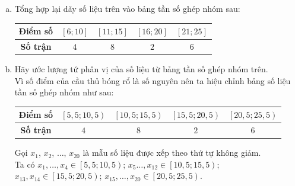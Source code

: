 \begin{bt}
{\begin{enumerate}[a)]
\begin{center}
\begin{tabular}{|c|c|c|c|c|c|c|c|c|c|}
					\hline 
					$ 14 $	& $ 15 $ & $ 18 $ & $ 18 $ & $ 21 $ & $ 22 $ & $ 23 $ & $ 24 $ & $ 25 $ & $ 25 $ \\
					\hline 
				\end{tabular} 
			\end{center}
			Tứ phân vị thứ nhất của mẫu số liệu là $ \dfrac{1}{2}\cdot\left( x_{5}+x_6\right) =\dfrac{1}{2}\cdot \left( 11+11\right)=11$.\\
			Tứ phân vị thứ hai của mẫu số liệu là $ \dfrac{1}{2}\cdot \left( x_{10}+x_{11}\right)= \dfrac{1}{2}\cdot \left( 14+14\right)=14$.\\
			Tứ phân vị thứ ba của mẫu số liệu là $ \dfrac{1}{2}\cdot \left( x_{15}+x_{16}\right)= \dfrac{1}{2}\cdot \left( 21+22\right)=21{,}5$.
			\item Tổng hợp lại dãy số liệu trên vào bảng tần số ghép nhóm sau:
			\begin{center}
				\begin{tabular}{|c|c|c|c|c|}
					\hline 
					\textbf{Điểm số}	& $ \left[ 6 ; 10\right]  $ & $ \left[ 11 ; 15\right]  $ & $ \left[16 ; 20 \right]  $ & $ \left[ 21 ; 25\right]  $ \\ 
					\hline 
					\textbf{Số trận}	& $ 4 $ & $ 8 $ & $ 2 $ & $ 6 $ \\ 
					\hline 
				\end{tabular} 
			\end{center}
			\item Hãy ước lượng tứ phân vị của số liệu từ bảng tần số ghép nhóm trên.\\
			Vì số điểm của cầu thủ bóng rổ là số nguyên nên ta hiệu chỉnh bảng số liệu  tần số ghép nhóm như sau:
			\begin{center}
				\begin{tabular}{|c|c|c|c|c|}
					\hline 
					\textbf{Điểm số}	& $ \left[ 5{,}5 ; 10{,}5\right)  $ & $ \left[ 10{,}5 ; 15{,}5\right)  $ & $ \left[15{,}5 ; 20{,}5 \right)  $ & $ \left[ 20{,}5 ; 25{,}5\right)  $ \\ 
					\hline 
					\textbf{Số trận}	& $ 4 $ & $ 8 $ & $ 2 $ & $ 6 $ \\ 
					\hline 
				\end{tabular} 
			\end{center}
			Gọi $ x_1 $, $ x_2 $, $ \ldots $, $ x_{20} $ là mẫu số liệu được xếp theo thứ tự không giảm.\\
			Ta có $ x_1, \ldots, x_4 \in  \left[ 5{,}5 ; 10{,}5\right) $; $ x_5 \ldots, x_{12} \in   \left[ 10{,}5 ; 15{,}5\right)$; $ x_{13}, x_{14}\in  \left[15{,}5 ; 20{,}5 \right) $; $ x_{15}, \ldots, x_{20} \in  \left[ 20{,}5 ; 25{,}5\right) $.\\

\end{enumerate}}
\end{bt}
